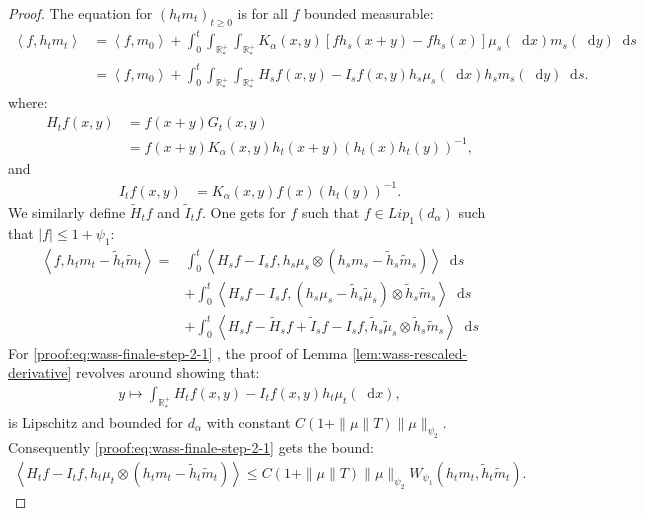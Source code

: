 \documentclass[11pt,a4paper]{article}
\newcommand{\RRP}{\mathbb{R}^+_*}
\newcommand{\Proc}[1]{\left(#1\right)_{t\geq 0}}
\newcommand{\brac}[1]{\left\langle#1\right\rangle}
\newcommand{\dd}{\mathop{}\!\mathrm{d}}
\begin{document}
\begin{proof}
    The equation for $\Proc{h_tm_t}$ is for all $f$ bounded measurable:
    \begin{align*}
        \brac{f,h_t m_t} 
        &= \brac{f,m_0} + \int_0^t \int_{\RRP} \int_{\RRP} K_\alpha(x,y) \left[fh_s(x+y) - fh_s(x)\right] \mu_s(\dd x) m_s(\dd y) \dd s \\
        &= \brac{f,m_0} + \int_0^t \int_{\RRP} \int_{\RRP} H_sf(x,y) - I_sf(x,y) h_s\mu_s(\dd x) h_sm_s(\dd y) \dd s.
    \end{align*}
    where:
    \begin{align*}
        H_tf(x,y) 
        &= f(x+y)G_t(x,y) \\
        &= f(x+y)K_\alpha(x,y)h_t(x+y)\left(h_t(x)h_t(y)\right)^{-1},
    \end{align*}
    and
    \begin{align*}
        I_tf(x,y) 
        &= K_\alpha(x,y)f(x)\left(h_t(y)\right)^{-1}.
    \end{align*}
    We similarly define $\tilde{H}_tf$ and $\tilde{I}_tf$. One gets for $f$ such that $f \in Lip_1(d_{\alpha})$ such that $|f| \leq 1 + \psi_1$:
    \begin{subequations}
    \begin{align}
        \brac{f, h_tm_t - \tilde{h}_t\tilde{m}_t} =& \int_0^t \brac{H_sf- I_sf ,h_s\mu_s \otimes \left(h_sm_s - \tilde{h}_s\tilde{m}_s \right) } \dd s\label{proof:eq:wass-finale-step-2-1}\\ 
        &+ \int_0^t\brac{H_sf- I_sf,\left(h_s\mu_s - \tilde{h}_s\tilde{\mu}_s\right)\otimes \tilde{h}_s\tilde{m}_s} \dd s\label{proof:eq:wass-finale-step-2-2} \\ 
        &+ \int_0^t \brac{H_sf-\tilde{H}_sf + \tilde{I}_sf - I_sf,\tilde{h}_s\tilde{\mu}_s\otimes \tilde{h}_s\tilde{m}_s}\dd s\label{proof:eq:wass-finale-step-2-3} 
    \end{align}
    \label{proof:eq:wass-finale-step-2}
    \end{subequations}
    For \eqref{proof:eq:wass-finale-step-2-1} , the proof of Lemma \ref{lem:wass-rescaled-derivative} revolves around showing that:
    \begin{align*}
        y \mapsto \int_{\RRP} H_tf(x,y)- I_tf(x,y) h_t\mu_t(\dd x), 
    \end{align*}
    is Lipschitz and bounded for $d_\alpha$ with constant $C(1 + \|\mu\|T)\|\mu\|_{\psi_2}$. Consequently \eqref{proof:eq:wass-finale-step-2-1} gets the bound:
    \begin{align*}
        \brac{H_tf- I_tf ,h_t\mu_t \otimes \left(h_tm_t - \tilde{h}_t\tilde{m}_t \right) } \leq C(1 + \|\mu\|T)\|\mu\|_{\psi_2}W_{\psi_1}\left(h_tm_t , \tilde{h}_t\tilde{m}_t \right).

\end{align*}
\end{proof}
\end{document}
